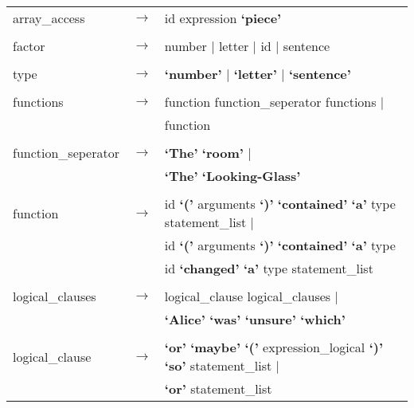 \documentclass[landscape]{article}
\begin{document}
\begin{longtable}{ l c l}
    array\_access & \ensuremath{\to} &  id expression  \textbf{`piece'}  \\

    \\

    factor & \ensuremath{\to} &  number  | letter  | id  | sentence   \\

    \\

    type & \ensuremath{\to} &  \textbf{`number'}  | \textbf{`letter'}  | \textbf{`sentence'}   \\

    \\

    functions & \ensuremath{\to} &  function  function\_seperator  functions   | \\
    & &  function \\

    \\

    function\_seperator & \ensuremath{\to} &  \textbf{`The'} \textbf{`room'}  | \\
    & & \textbf{`The'} \textbf{`Looking-Glass'} \\

    \\

    function & \ensuremath{\to} &  id \textbf{`('} arguments  \textbf{`)'} \textbf{`contained'} \textbf{`a'} type  statement\_list   | \\
    & &  id \textbf{`('} arguments  \textbf{`)'} \textbf{`contained'} \textbf{`a'} type \\
	& &  id \textbf{`changed'} \textbf{`a'} type  statement\_list  \\

    \\

    logical\_clauses & \ensuremath{\to} &  logical\_clause  logical\_clauses   | \\
    & &  \textbf{`Alice'} \textbf{`was'} \textbf{`unsure'} \textbf{`which'}  \\

    \\

    logical\_clause & \ensuremath{\to} &  \textbf{`or'} \textbf{`maybe'} \textbf{`('} expression\_logical  \textbf{`)'} \textbf{`so'} statement\_list   | \\
    & &  \textbf{`or'} statement\_list   \\


\end{longtable}
\end{document}
